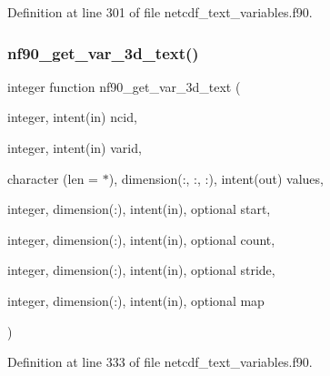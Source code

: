 Definition at line 301 of file netcdf\+\_\+text\+\_\+variables.\+f90.

\mbox{\label{netcdf__text__variables_8f90_ac1af6b101c3f3b575dc171548abed217}} 
\subsubsection{\texorpdfstring{nf90\+\_\+get\+\_\+var\+\_\+3d\+\_\+text()}{nf90\_get\_var\_3d\_text()}}
{\footnotesize\ttfamily integer function nf90\+\_\+get\+\_\+var\+\_\+3d\+\_\+text (\begin{DoxyParamCaption}\item[{integer, intent(in)}]{ncid,  }\item[{integer, intent(in)}]{varid,  }\item[{character (len = $\ast$), dimension(\+:, \+:, \+:), intent(out)}]{values,  }\item[{integer, dimension(\+:), intent(in), optional}]{start,  }\item[{integer, dimension(\+:), intent(in), optional}]{count,  }\item[{integer, dimension(\+:), intent(in), optional}]{stride,  }\item[{integer, dimension(\+:), intent(in), optional}]{map }\end{DoxyParamCaption})}



Definition at line 333 of file netcdf\+\_\+text\+\_\+variables.\+f90.

\mbox{\label{netcdf__text__variables_8f90_ac969f9a8af11404d2568b7431e6a175d}} 
